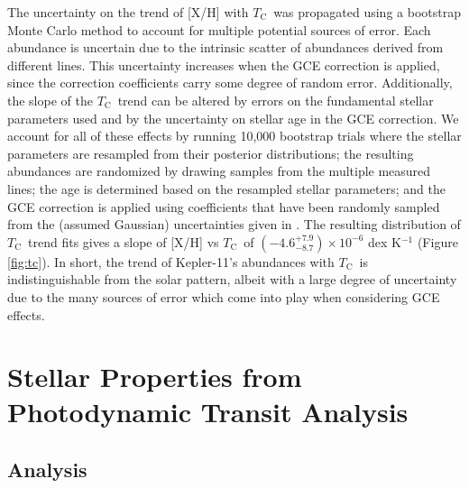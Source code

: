 \documentclass[twocolumn,trackchanges]{aastex61}
\newcommand{\tc}{$T_\mathrm{C}$}
\begin{document}
The uncertainty on the trend of [X/H] with \tc\ was propagated using a bootstrap Monte Carlo method to account for multiple potential sources of error. Each abundance is uncertain due to the intrinsic scatter of abundances derived from different lines. This uncertainty increases when the GCE correction is applied, since the correction coefficients carry some degree of random error. Additionally, the slope of the \tc\ trend can be altered by errors on the fundamental stellar parameters used \citep[as seen in][]{Teske2015} and by the uncertainty on stellar age in the GCE correction. We account for all of these effects by running 10,000 bootstrap trials where the stellar parameters are resampled from their posterior distributions; the resulting abundances are randomized by drawing samples from the multiple measured lines; the age is determined based on the resampled stellar parameters; and the GCE correction is applied using coefficients that have been randomly sampled from the (assumed Gaussian) uncertainties given in \citet{Spina2016b}. The resulting distribution of \tc\ trend fits gives a slope of [X/H] vs \tc\ of $(-4.6^{+7.9}_{-8.7}) \times 10^{-6}$ dex K$^{-1}$ (Figure  \ref{fig:tc}). In short, the trend of Kepler-11's abundances with \tc\ is indistinguishable from the solar pattern, albeit with a large degree of uncertainty due to the many sources of error which come into play when considering GCE effects.





\section{Stellar Properties from Photodynamic Transit Analysis}
\label{s:ttvs}

\subsection{Analysis}
\end{document}
